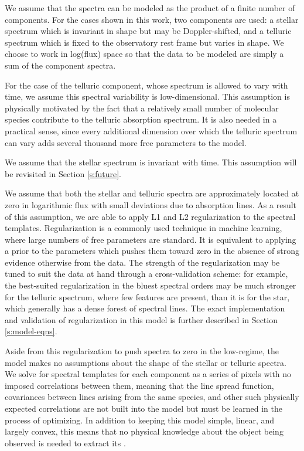 \documentclass[modern]{aastex62}
\begin{document}
We assume that the spectra can be modeled as the product of a finite number of components. 
For the cases shown in this work, two components are used: a stellar spectrum which is invariant in shape but may be Doppler-shifted, and a telluric spectrum which is fixed to the observatory rest frame but varies in shape. 
We choose to work in log(flux) space so that the data to be modeled are simply a sum of the component spectra.

For the case of the telluric component, whose spectrum is allowed to vary with time, we assume this spectral variability is low-dimensional. 
This assumption is physically motivated by the fact that a relatively small number of molecular species contribute to the telluric absorption spectrum. 
It is also needed in a practical sense, since every additional dimension over which the telluric spectrum can vary adds several thousand more free parameters to the model.

We assume that the stellar spectrum is invariant with time. 
This assumption will be revisited in Section \ref{s:future}. 

We assume that both the stellar and telluric spectra are approximately located at zero in logarithmic flux with small deviations due to absorption lines. 
As a result of this assumption, we are able to apply L1 and L2 regularization to the spectral templates. 
Regularization is a commonly used technique in machine learning, where large numbers of free parameters are standard. 
It is equivalent to applying a prior to the parameters which pushes them toward zero in the absence of strong evidence otherwise from the data. 
The strength of the regularization may be tuned to suit the data at hand through a cross-validation scheme: for example, the best-suited regularization in the bluest spectral orders may be much stronger for the telluric spectrum, where few features are present, than it is for the star, which generally has a dense forest of spectral lines. 
The exact implementation and validation of regularization in this model is further described in Section \ref{s:model-eqns}.

Aside from this regularization to push spectra to zero in the low-\SNR regime, the model makes no assumptions about the shape of the stellar or telluric spectra. 
We solve for spectral templates for each component as a series of pixels with no imposed correlations between them, meaning that the line spread function, covariances between lines arising from the same species, and other such physically expected correlations are not built into the model but must be learned in the process of optimizing. 
In addition to keeping this model simple, linear, and largely convex, this means that no physical knowledge about the object being observed is needed to extract its \RVs. 
\end{document}
